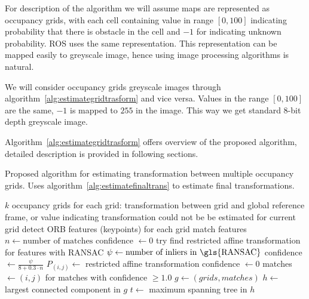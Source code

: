 For description of the algorithm we will assume maps are represented as occupancy grids, with each cell containing value in range $[0,100]$ indicating probability that there is obstacle in the cell and $-1$ for indicating unknown probability. \gls{ROS} uses the same representation. This representation can be mapped easily to greyscale image, hence using image processing algorithms is natural.

We will consider occupancy grids greyscale images through algorithm~\ref{alg:estimategridtrasform} and vice versa. Values in the range $[0,100]$ are the same, $-1$ is mapped to $255$ in the image. This way we get standard $8$-bit depth greyscale image.

Algorithm~\ref{alg:estimategridtrasform} offers overview of the proposed algorithm, detailed description is provided in following sections.

\begin{algorithm}
    \caption{Proposed algorithm for estimating transformation between multiple occupancy grids. Uses algorithm~\ref{alg:estimatefinaltrans} to estimate final transformations.}
    \label{alg:estimategridtrasform}
    \begin{algorithmic}[1]
        \Require $k$ occupancy grids
        \Ensure for each grid: transformation between grid and global reference frame, or value indicating transformation could not be be estimated for current grid
            \State detect \gls{ORB} features (keypoints) for each grid
             
            	\State match features
            	\State $n \gets \text{number of matches}$
            		\State confidence $\gets 0$
            	\Else
            		\State try find restricted affine transformation for features with \gls{RANSAC}
            		\State $\psi \gets \text{number of inliers in \gls{RANSAC}}$
            			\State confidence $\gets \frac{\psi}{8 + 0.3 \cdot n}$
                        \State $P_{(i,j)} \gets$ restricted affine transformation
            		\Else
            			\State confidence $\gets 0$
            		\EndIf
            	\EndIf
            \EndFor
            \State matches $\gets (i,j)$ for matches with confidence $\ge 1.0$
            \State $g \gets (grids, matches)$
            \State $h \gets$ largest connected component in $g$
            \State $t \gets$ maximum spanning tree in $h$
            \State {} 
        \EndProcedure
    \end{algorithmic}
\end{algorithm}

